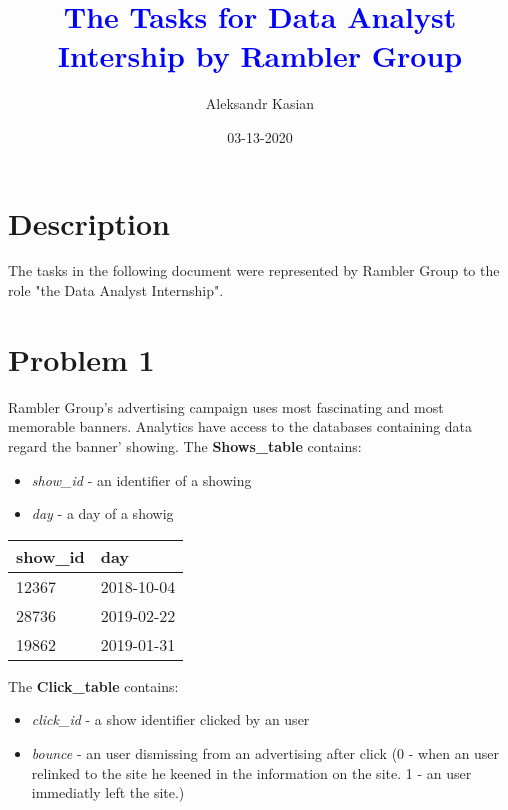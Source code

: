 \documentclass[14pt, a4paper]{extarticle}
\title{\textcolor{blue}{The Tasks for Data Analyst Intership by Rambler Group}}
\date{03-13-2020}
\author{Aleksandr Kasian}
\begin{document}
\begin{titlepage}
	\maketitle
\end{titlepage}
\newpage

\tableofcontents

\newpage

\section*{Description}
%
The tasks in the following document were represented by Rambler Group to the role "the Data Analyst Internship".

\section*{Problem 1}
%
Rambler Group's advertising campaign uses most fascinating and most memorable banners.
Analytics have access to the databases containing data regard the banner' showing.
The \textbf{Shows\_table} contains:
\begin{itemize}
	\item \emph{show\_id} - an identifier of a showing 
	\item \emph{day} - a day of a showig
\end{itemize}

\begin{table}[h]
	\begin{tabular}{|l|l|}
	\hline
	show\_id & day        \\ \hline
	12367    & 2018-10-04 \\ \hline
	28736    & 2019-02-22 \\ \hline
	19862    & 2019-01-31 \\ \hline
	\end{tabular}
\end{table}

\noindent
The \textbf{Click\_table} contains:
\begin{itemize}
	\item \emph{click\_id} - a show identifier clicked by an user
	\item \emph{bounce} - an user dismissing from an advertising after click (0 - when an user relinked to the site 
	he keened in the information on the site. 1 - an user immediatly left the site.)
\end{itemize}
\end{document}
